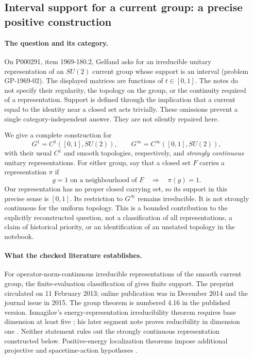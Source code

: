 \subsection{Interval support for a current group: a precise positive construction}
\label{dev:current-support}

\paragraph{The question and its category.}
On P000291, item 1969-180.2, Gelfand asks for an irreducible unitary
representation of an $SU(2)$ current group whose support is an interval
(problem GP-1969-02). The displayed matrices are functions of
$t\in[0,1]$. The notes do not specify their regularity, the topology on
the group, or the continuity required of a representation. Support is
defined through the implication that a current equal to the identity
near a closed set acts trivially. These omissions prevent a single
category-independent answer. They are not silently repaired here.

We give a complete construction for
\[
 G^1=C^1([0,1],SU(2)),\qquad
 G^\infty=C^\infty([0,1],SU(2)),
\]
with their usual $C^1$ and smooth topologies, respectively, and
\emph{strongly continuous} unitary representations. For either group,
say that a closed set $F$ carries a representation $\pi$ if
\[
 g=1\text{ on a neighbourhood of }F\quad\Longrightarrow\quad\pi(g)=1.
\]
Our representation has no proper closed carrying set, so its support in
this precise sense is $[0,1]$. Its restriction to $G^\infty$ remains
irreducible. It is not strongly continuous for the uniform topology.
This is a bounded contribution to the explicitly reconstructed question,
not a classification of all representations, a claim of historical
priority, or an identification of an unstated topology in the notebook.

\paragraph{What the checked literature establishes.}
For operator-norm-continuous irreducible representations of the smooth
current group, the finite-evaluation classification of
\citet[arXiv version, Thms.~4.11 and 4.15]{janssensneeb2015norm}
gives finite support. The preprint circulated on 11 February 2013;
online publication was in December 2014 and the journal issue in 2015.
The group theorem is numbered 4.16 in the published version.
Ismagilov's energy-representation irreducibility theorem requires base
dimension at least five \citep[\S\S1--2]{ismagilov1976unitary}; his
later segment note proves reducibility in dimension one
\citep[pp.~73--74 in the Russian original]{ismagilov1981segment}.
Neither statement rules out the strongly continuous representation
constructed below. Positive-energy localization theorems impose
additional projective and spacetime-action hypotheses
\citep[Introduction]{janssensneeb2024positive}.

